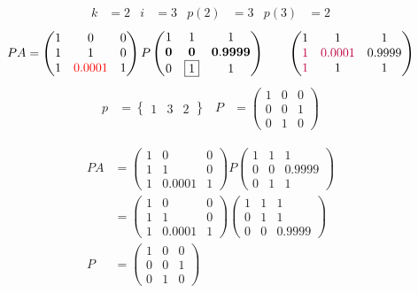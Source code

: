 \documentclass[pdf]{beamer}
\begin{document}
\begin{frame}{}\begin{align*} k &= 2 & i &= 3 & p(2) &= 3 & p(3) &= 2\end{align*}$$PA=\begin{pmatrix}1&0&0\\1&1&0\\1&{\color{red}0.0001}&1\end{pmatrix} P \begin{pmatrix}1&1&1\\\mathbf{0}&\mathbf{0}&\mathbf{0.9999}\\0&\boxed{1}&1\end{pmatrix} \quad\quad \begin{pmatrix}1&1&1\\{\color{purple}1}&{\color{purple}0.0001}&0.9999\\{\color{purple}1}&1&1\end{pmatrix}$$\begin{align*} p&= \begin{Bmatrix}1&3&2\end{Bmatrix} & P&= \begin{pmatrix}1&0&0\\0&0&1\\0&1&0\end{pmatrix} \end{align*}\end{frame}
\begin{frame}{}\begin{align*}PA&=\begin{pmatrix}1&0&0\\1&1&0\\1&0.0001&1\end{pmatrix} P \begin{pmatrix}1&1&1\\0&0&0.9999\\0&1&1\end{pmatrix}\\&= \begin{pmatrix}1&0&0\\1&1&0\\1&0.0001&1\end{pmatrix} \begin{pmatrix}1&1&1\\0&1&1\\0&0&0.9999\end{pmatrix} \\ P&= \begin{pmatrix}1&0&0\\0&0&1\\0&1&0\end{pmatrix}\end{align*}
\end{frame}
\end{document}
